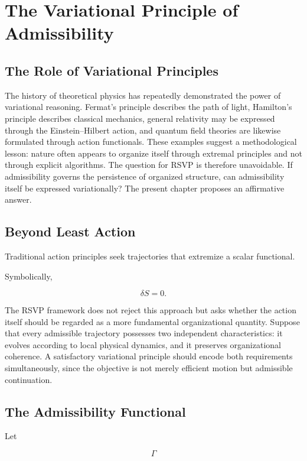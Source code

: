 \documentclass[11pt,oneside]{book}
\numberwithin{equation}{chapter}
\theoremstyle{definition}
\theoremstyle{plain}
\begin{document}
\chapter{The Variational Principle of Admissibility}

\section{The Role of Variational Principles}

The history of theoretical physics has repeatedly demonstrated the power of variational reasoning. Fermat's principle describes the path of light, Hamilton's principle describes classical mechanics, general relativity may be expressed through the Einstein--Hilbert action, and quantum field theories are likewise formulated through action functionals. These examples suggest a methodological lesson: nature often appears to organize itself through extremal principles and not through explicit algorithms. The question for RSVP is therefore unavoidable. If admissibility governs the persistence of organized structure, can admissibility itself be expressed variationally? The present chapter proposes an affirmative answer.

\section{Beyond Least Action}

Traditional action principles seek trajectories that extremize a scalar
functional.

Symbolically,

\[
\delta S = 0.
\]

The RSVP framework does not reject this approach but asks whether the action itself should be regarded as a more fundamental organizational quantity. Suppose that every admissible trajectory possesses two independent characteristics: it evolves according to local physical dynamics, and it preserves organizational coherence. A satisfactory variational principle should encode both requirements simultaneously, since the objective is not merely efficient motion but admissible continuation.

\section{The Admissibility Functional}

Let

\[
\Gamma
\]
\end{document}
